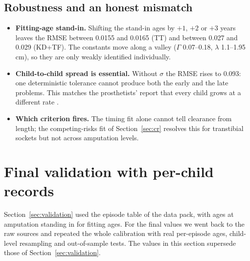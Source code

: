 \documentclass[11pt]{article}
\theoremstyle{definition}
\begin{document}
\subsection{Robustness and an honest mismatch}
\begin{itemize}[leftmargin=1.4em,itemsep=2pt]
\item \textbf{Fitting-age stand-in.} Shifting the stand-in ages by $+1$, $+2$ or $+3$ years leaves the RMSE between 0.0155 and 0.0165 (TT) and between 0.027 and 0.029 (KD+TF). The constants move along a valley ($\Gamma$ 0.07--0.18, $\lambda$ 1.1--1.95\,cm), so they are only weakly identified individually.
\item \textbf{Child-to-child spread is essential.} Without $\sigma$ the RMSE rises to 0.093: one deterministic tolerance cannot produce both the early and the late problems. This matches the prosthetists' report that every child grows at a different rate \cite{ghidini2025}.
\item \textbf{Which criterion fires.} The timing fit alone cannot tell clearance from length; the competing-risks fit of Section~\ref{sec:cr} resolves this for transtibial sockets but not across amputation levels.
\end{itemize}

\section{Final validation with per-child records}
\label{sec:final}
Section~\ref{sec:validation} used the episode table of the data pack, with ages at amputation standing in for fitting ages. For the final values we went back to the raw sources and repeated the whole calibration with real per-episode ages, child-level resampling and out-of-sample tests. The values in this section supersede those of Section~\ref{sec:validation}.
\end{document}
